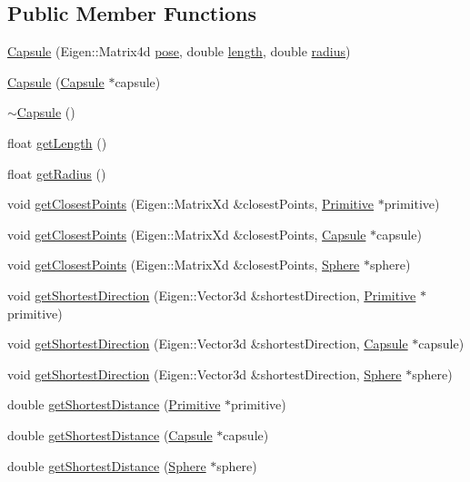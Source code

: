 \subsection*{Public Member Functions}
\begin{DoxyCompactItemize}
\item 
\hyperlink{class_capsule_aab6d0827aa8179c3f258129161a67e2e}{Capsule} (Eigen\+::\+Matrix4d \hyperlink{class_primitive_ad8b2afbad412f6046783d155c88fe312}{pose}, double \hyperlink{class_capsule_af62f20ecfc37b4c8ae88dd505ca1f196}{length}, double \hyperlink{class_capsule_a9b7e591748a2b735b35d99a2d7792f39}{radius})
\item 
\hyperlink{class_capsule_a94838c4642111c07dbf83fdc775d1a68}{Capsule} (\hyperlink{class_capsule}{Capsule} $\ast$capsule)
\item 
\hyperlink{class_capsule_abfd7f0348ce8e7f8ee4e70374ae27533}{$\sim$\+Capsule} ()
\item 
float \hyperlink{class_capsule_a8ff7a408a608ee32dea8c187fce5dbea}{get\+Length} ()
\item 
float \hyperlink{class_capsule_a4e98e8545ea57fe682c5a2002bd49bdb}{get\+Radius} ()
\item 
void \hyperlink{class_capsule_aec53e0cf5f8644f1413c3c208de64cc7}{get\+Closest\+Points} (Eigen\+::\+Matrix\+Xd \&closest\+Points, \hyperlink{class_primitive}{Primitive} $\ast$primitive)
\item 
void \hyperlink{class_capsule_a9da1b4c44adba1726446a4fb37b7a7e0}{get\+Closest\+Points} (Eigen\+::\+Matrix\+Xd \&closest\+Points, \hyperlink{class_capsule}{Capsule} $\ast$capsule)
\item 
void \hyperlink{class_capsule_aa0fea610bb1a1e4016bbda0f4f88264a}{get\+Closest\+Points} (Eigen\+::\+Matrix\+Xd \&closest\+Points, \hyperlink{class_sphere}{Sphere} $\ast$sphere)
\item 
void \hyperlink{class_capsule_ad569eae23b91f33e145f06745739e428}{get\+Shortest\+Direction} (Eigen\+::\+Vector3d \&shortest\+Direction, \hyperlink{class_primitive}{Primitive} $\ast$primitive)
\item 
void \hyperlink{class_capsule_a28274c18ef5a3b9ef869caa64d5f7d5e}{get\+Shortest\+Direction} (Eigen\+::\+Vector3d \&shortest\+Direction, \hyperlink{class_capsule}{Capsule} $\ast$capsule)
\item 
void \hyperlink{class_capsule_aae076a389170bd6644f479bfe9c243bc}{get\+Shortest\+Direction} (Eigen\+::\+Vector3d \&shortest\+Direction, \hyperlink{class_sphere}{Sphere} $\ast$sphere)
\item 
double \hyperlink{class_capsule_a43bcc7bb95425a4559f7fd0289ef8b45}{get\+Shortest\+Distance} (\hyperlink{class_primitive}{Primitive} $\ast$primitive)
\item 
double \hyperlink{class_capsule_ade8880442a9230f893c296f0681ae9ad}{get\+Shortest\+Distance} (\hyperlink{class_capsule}{Capsule} $\ast$capsule)
\item 
double \hyperlink{class_capsule_a71d7821f3e7f9ac972bceb06d82f529d}{get\+Shortest\+Distance} (\hyperlink{class_sphere}{Sphere} $\ast$sphere)
\end{DoxyCompactItemize}
